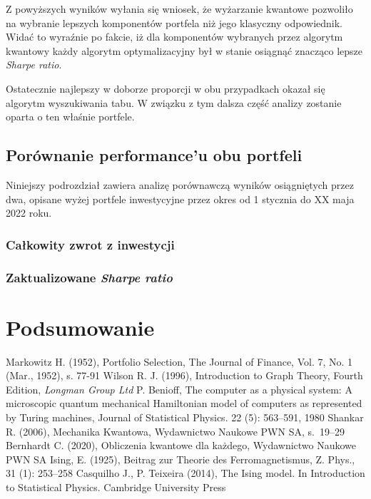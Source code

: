 \documentclass[12pt,a4paper,twoside,openany]{book}
\begin{document}
Z powyższych wyników wyłania się wniosek, że wyżarzanie kwantowe pozwoliło na wybranie lepszych komponentów portfela niż jego klasyczny odpowiednik.
Widać to wyraźnie po fakcie, iż dla komponentów wybranych przez algorytm kwantowy każdy algorytm optymalizacyjny był w stanie osiągnąć znacząco lepsze \textit{Sharpe ratio}.

Ostatecznie najlepszy w doborze proporcji w obu przypadkach okazał się algorytm wyszukiwania tabu.
W związku z tym dalsza część analizy zostanie oparta o ten właśnie portfele.

\section{Porównanie performance'u obu portfeli}

Niniejszy podrozdział zawiera analizę porównawczą wyników osiągniętych przez dwa, opisane wyżej portfele inwestycyjne przez okres od 1 stycznia do XX maja 2022 roku.

\subsection{Całkowity zwrot z inwestycji}

\subsection{Zaktualizowane \textit{Sharpe ratio}}



\clearpage

\chapter{Podsumowanie}

\clearpage
{}
\begin{thebibliography}{99}
\setlength{\itemsep}{0pt}%
 Markowitz H. (1952), Portfolio Selection, The Journal of Finance, Vol. 7, No. 1 (Mar., 1952), s. 77-91
 Wilson R. J. (1996), Introduction to Graph Theory, Fourth Edition, \textit{Longman Group Ltd}
P. Benioff, The computer as a physical system: A microscopic quantum mechanical Hamiltonian model of
computers as represented by Turing machines, Journal of Statistical Physics. 22 (5): 563–591, 1980
 Shankar R. (2006), Mechanika Kwantowa, Wydawnictwo Naukowe PWN SA, s.~19--29
  Bernhardt C. (2020), Obliczenia kwantowe dla każdego, Wydawnictwo Naukowe PWN SA
 Ising, E. (1925), Beitrag zur Theorie des Ferromagnetismus, Z. Phys., 31 (1): 253–258
 Casquilho J., P. Teixeira (2014), The Ising model. In Introduction to Statistical Physics. Cambridge
University Press



\end{thebibliography}
\end{document}

